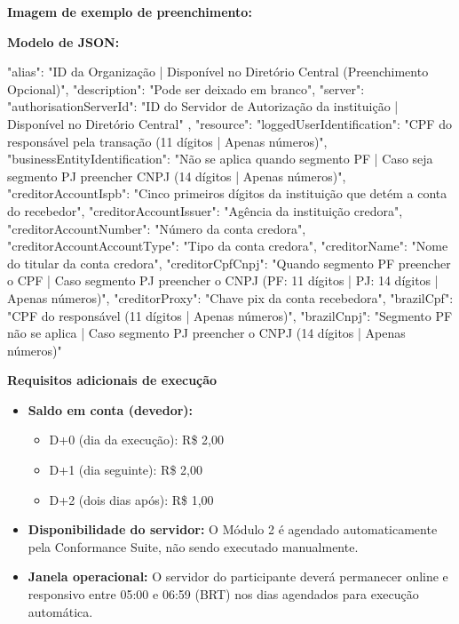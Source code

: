 \textbf{Imagem de exemplo de preenchimento:}

\begin{figure}[H]
    \centering
    \label{fig:pixautomaticolonga}
\end{figure}

\textbf{Modelo de JSON:}

\begin{codeblock}
{
    "alias": "ID da Organização | Disponível no Diretório Central (Preenchimento Opcional)",
    "description": "Pode ser deixado em branco",
    "server": {
        "authorisationServerId": "ID do Servidor de Autorização da instituição  | Disponível no Diretório Central"
    },
    "resource": {
        "loggedUserIdentification": "CPF do responsável pela transação (11 dígitos | Apenas números)",
        "businessEntityIdentification": "Não se aplica quando segmento PF | Caso seja segmento PJ preencher CNPJ (14 dígitos | Apenas números)",
        "creditorAccountIspb": "Cinco primeiros dígitos da instituição que detém a conta do recebedor",
        "creditorAccountIssuer": "Agência da instituição credora",
        "creditorAccountNumber": "Número da conta credora",
        "creditorAccountAccountType": "Tipo da conta credora",
        "creditorName": "Nome do titular da conta credora",
        "creditorCpfCnpj": "Quando segmento PF preencher o CPF | Caso segmento PJ preencher o CNPJ (PF: 11 dígitos | PJ: 14 dígitos | Apenas números)",
        "creditorProxy": "Chave pix da conta recebedora",
        "brazilCpf": "CPF do responsável (11 dígitos | Apenas números)",
        "brazilCnpj": "Segmento PF não se aplica | Caso segmento PJ preencher o CNPJ (14 dígitos | Apenas números)"
    }
}
\end{codeblock}

\textbf{Requisitos adicionais de execução}

\begin{itemize}
    \item \textbf{Saldo em conta (devedor):}
    \begin{itemize}
        \item D+0 (dia da execução): R\$ 2,00
        \item D+1 (dia seguinte): R\$ 2,00
        \item D+2 (dois dias após): R\$ 1,00
    \end{itemize}
    \item \textbf{Disponibilidade do servidor:} O Módulo 2 é agendado automaticamente pela Conformance Suite, não sendo executado manualmente.
    \item \textbf{Janela operacional:} O servidor do participante deverá permanecer online e responsivo entre 05:00 e 06:59 (BRT) nos dias agendados para execução automática.
\end{itemize}

